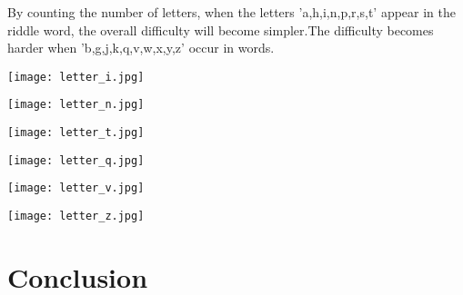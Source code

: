 \documentclass{mcmthesis}
\begin{document}
By counting the number of letters, when the letters 'a,h,i,n,p,r,s,t' appear in the riddle word, the overall difficulty will become simpler.The difficulty becomes harder when 'b,g,j,k,q,v,w,x,y,z' occur in words.
\begin{figure*}[htbp] %
	\begin{minipage}[t]{0.33\linewidth} %
		\centering
		\texttt{[image: letter\_i.jpg]} %
	\end{minipage}%
	\begin{minipage}[t]{0.33\linewidth}
		\centering
		\texttt{[image: letter\_n.jpg]}
	\end{minipage}%
	\begin{minipage}[t]{0.33\linewidth}
		\centering
		\texttt{[image: letter\_t.jpg]}
	\end{minipage}
\end{figure*}
\begin{figure*}[htbp] %
	\begin{minipage}[t]{0.33\linewidth} %
		\centering
		\texttt{[image: letter\_q.jpg]} %
	\end{minipage}%
	\begin{minipage}[t]{0.33\linewidth}
		\centering
		\texttt{[image: letter\_v.jpg]}
	\end{minipage}%
	\begin{minipage}[t]{0.33\linewidth}
		\centering
		\texttt{[image: letter\_z.jpg]}
	\end{minipage}
\end{figure*}
\section{Conclusion}
\end{document}
